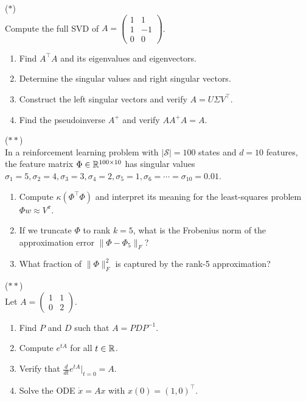 \documentclass[11pt,a4paper]{article}
\begin{document}
\begin{exercise}
\label{exer:svd}
\textnormal{(\(*\))} \\
Compute the full SVD of $A = \begin{pmatrix} 1 & 1 \\ 1 & -1 \\ 0 & 0 \end{pmatrix}$.
\begin{enumerate}[nosep,label=(\alph*)]
  \item Find $A^\top A$ and its eigenvalues and eigenvectors.
  \item Determine the singular values and right singular vectors.
  \item Construct the left singular vectors and verify $A = U\Sigma V^\top$.
  \item Find the pseudoinverse $A^+$ and verify $A A^+ A = A$.
\end{enumerate}
\end{exercise}

\begin{exercise}
\label{exer:eckart_young}
\textnormal{(\(**\))} \\
In a reinforcement learning problem with $|\mathcal{S}| = 100$ states
and $d = 10$ features, the feature matrix $\Phi \in \mathbb{R}^{100 \times 10}$
has singular values
$\sigma_1 = 5, \sigma_2 = 4, \sigma_3 = 3, \sigma_4 = 2, \sigma_5 = 1,
\sigma_6 = \cdots = \sigma_{10} = 0.01$.
\begin{enumerate}[nosep,label=(\alph*)]
  \item Compute $\kappa(\Phi^\top \Phi)$ and interpret its meaning
        for the least-squares problem $\Phi w \approx V^\pi$.
  \item If we truncate $\Phi$ to rank $k = 5$, what is the Frobenius
        norm of the approximation error $\|\Phi - \Phi_5\|_F$?
  \item What fraction of $\|\Phi\|_F^2$ is captured by the rank-5
        approximation?
\end{enumerate}
\end{exercise}

\begin{exercise}
\label{exer:exp}
\textnormal{(\(**\))} \\
Let $A = \begin{pmatrix} 1 & 1 \\ 0 & 2 \end{pmatrix}$.
\begin{enumerate}[nosep,label=(\alph*)]
  \item Find $P$ and $D$ such that $A = PDP^{-1}$.
  \item Compute $e^{tA}$ for all $t \in \mathbb{R}$.
  \item Verify that $\frac{d}{dt}e^{tA}\big|_{t=0} = A$.
  \item Solve the ODE $\dot{x} = Ax$ with $x(0) = (1, 0)^\top$.
\end{enumerate}
\end{exercise}
\end{document}

